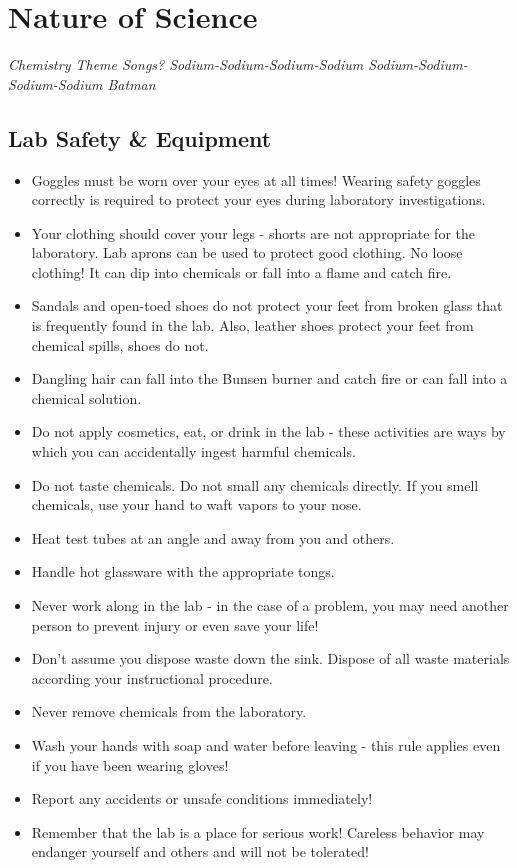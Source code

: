 \documentclass[../hchem.tex]{subfiles}
\begin{document}
\chapter{Nature of Science}
\textit{Chemistry Theme Songs? Sodium-Sodium-Sodium-Sodium Sodium-Sodium-Sodium-Sodium Batman}

\section{Lab Safety \& Equipment}
\begin{itemize}
    \item Goggles must be worn over your eyes at all times! Wearing safety goggles correctly is required to protect your eyes during laboratory investigations.
    \item Your clothing should cover your legs - shorts are not appropriate for the laboratory. Lab aprons can be used to protect good clothing. No loose clothing! It can dip into chemicals or fall into a flame and catch fire.
    \item Sandals and open-toed shoes do not protect your feet from broken glass that is frequently found in the lab. Also, leather shoes protect your feet from chemical spills, shoes do not.
    \item Dangling hair can fall into the Bunsen burner and catch fire or can fall into a chemical solution.
    \item Do not apply cosmetics, eat, or drink in the lab - these activities are ways by which you can accidentally ingest harmful chemicals.
    \item Do not taste chemicals. Do not small any chemicals directly. If you smell chemicals, use your hand to waft vapors to your nose.
    \item Heat test tubes at an angle and away from you and others.
    \item Handle hot glassware with the appropriate tongs.
    \item Never work along in the lab - in the case of a problem, you may need another person to prevent injury or even save your life!
    \item Don't assume you dispose waste down the sink. Dispose of all waste materials according your instructional procedure.
    \item Never remove chemicals from the laboratory.
    \item Wash your hands with soap and water before leaving - this rule applies even if you have been wearing gloves!
    \item Report any accidents or unsafe conditions immediately!
    \item Remember that the lab is a place for serious work! Careless behavior may endanger yourself and others and will not be tolerated!
\end{itemize}
\end{document}
